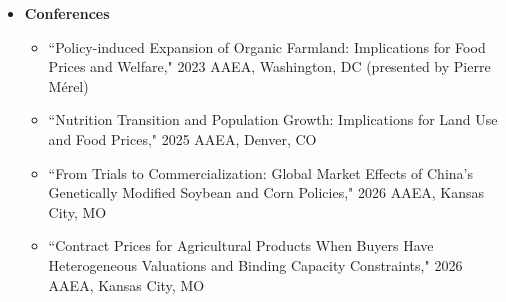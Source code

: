 \documentclass{article}[12]
\begin{document}
\begin{itemize}[itemsep=0.75em]

        \item \textbf{Conferences}
    \begin{itemize}
         \item ``Policy-induced Expansion of Organic Farmland: Implications for Food Prices and Welfare," 2023 AAEA, Washington, DC (presented by Pierre M\'erel) %
        \item ``Nutrition Transition and Population Growth: Implications for Land Use and Food Prices," 2025 AAEA, Denver, CO %
        \item ``From Trials to Commercialization: Global Market Effects of China’s Genetically Modified Soybean and Corn Policies," 2026 AAEA, Kansas City, MO %
        \item ``Contract Prices for Agricultural Products When Buyers Have Heterogeneous Valuations and Binding Capacity Constraints," 2026 AAEA, Kansas City, MO %
    \end{itemize}




\end{itemize}

\end{document}
